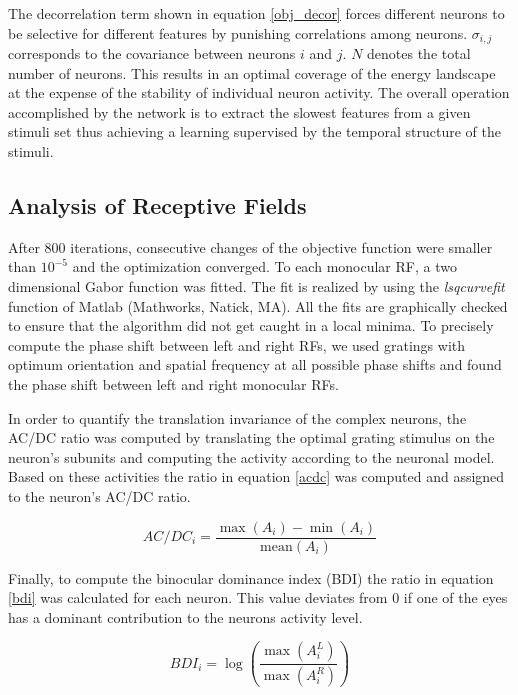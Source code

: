 The decorrelation term shown in equation \ref{obj_decor} forces different
neurons to be selective for different features by punishing correlations
among neurons. $\sigma_{i,j}$ corresponds to the covariance between neurons
$i$ and $j$. $N$ denotes the total number of neurons. This results in an
optimal coverage of the energy landscape at the expense of the stability of
individual neuron activity. The overall operation accomplished by the
network is to extract the slowest features from a given stimuli set thus
achieving a learning supervised by the temporal structure of the stimuli. 

\subsection{Analysis of Receptive Fields}
	 

After 800 iterations, consecutive changes of the objective function were
smaller than $10^{-5}$ and the optimization converged. To each monocular
RF, a two dimensional Gabor function was fitted. The fit is realized by
using the \textit{lsqcurvefit} function of Matlab (Mathworks, Natick, MA).
All the fits are graphically checked to ensure that the algorithm did not
get caught in a local minima. To precisely compute the phase shift between
left and right RFs, we used gratings with optimum orientation and spatial
frequency at all possible phase shifts and found the phase shift between
left and right monocular RFs. 


In order to quantify the translation invariance of the complex neurons, the
AC/DC ratio \citep{dean1983a} was computed by translating the optimal
grating stimulus on the neuron's subunits and computing the activity
according to the neuronal model. Based on these activities the ratio in
equation \ref{acdc} was computed and assigned to the neuron's AC/DC ratio. 

\begin{equation} AC/DC_i =
\frac{\max(A_i)-\min(A_i)}{\textrm{mean}(A_i)} \label{acdc} \end{equation}
	 		 
Finally, to compute the binocular dominance index (BDI) the ratio in
equation \ref{bdi} was calculated for each neuron. This value deviates from
0 if one of the eyes has a dominant contribution to the neurons activity
level.

\begin{equation}  BDI_i =
\log(\frac{\max(A_{i}^{L})}{\max(A_{i}^{R})}) 
\label{bdi}
\end{equation}


